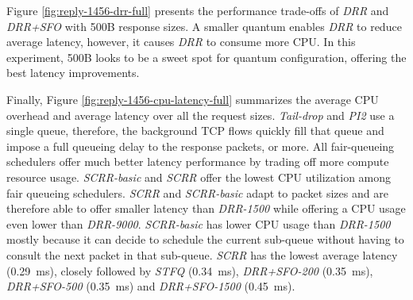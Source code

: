 Figure \ref{fig:reply-1456-drr-full} presents the performance
trade-offs of \textit{DRR} and \textit{DRR+SFO} with 500B response
sizes. A smaller quantum enables \textit{DRR} to reduce average
latency, however, it causes \textit{DRR} to consume more CPU. In this
experiment, 500B looks to be a sweet spot for quantum configuration,
offering the best latency improvements.

Finally, Figure \ref{fig:reply-1456-cpu-latency-full} summarizes the
average CPU overhead and average latency over all the request
sizes. \textit{Tail-drop} and \textit{PI2} use a single queue,
therefore, the background TCP flows quickly fill that queue and impose
a full queueing delay to the response packets, or more. All fair-queueing
schedulers offer much better latency performance by trading off more
compute resource usage. \textit{SCRR-basic} and \textit{SCRR} offer
the lowest CPU utilization among fair queueing
schedulers. \textit{SCRR} and \textit{SCRR-basic} adapt to packet
sizes and are therefore able to offer smaller latency than
\textit{DRR-1500} while offering a CPU usage even lower than
\textit{DRR-9000}. \textit{SCRR-basic} has lower CPU usage than
\textit{DRR-1500} mostly because it can decide to schedule the current
sub-queue without having to consult the next packet in that
sub-queue. \textit{SCRR} has the lowest average latency (0.29~ms),
closely followed by \textit{STFQ} (0.34~ms), \textit{DRR+SFO-200}
(0.35~ms), \textit{DRR+SFO-500} (0.35~ms) and \textit{DRR+SFO-1500}
(0.45~ms).

